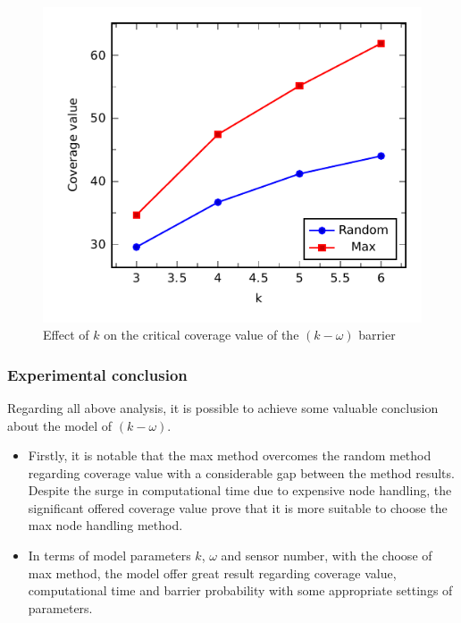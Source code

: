 \begin{figure}[h]
	\centering
	\includegraphics[scale=1.]{Hinhanh/kEffect/main.pdf}
	\caption{Effect of $k$ on the critical coverage value of the $(k-\omega)$ barrier}
	\label{fig:}
\end{figure}

\subsubsection{Experimental conclusion}
Regarding all above analysis, it is possible to achieve some valuable conclusion about the model of $(k-\omega)$.
\begin{itemize}
	\item Firstly, it is notable that the max method overcomes the random method regarding coverage value with a considerable gap between the method results. Despite the surge in computational time due to expensive node handling, the significant offered coverage value prove that it is more suitable to choose the max node handling method.
	\item In terms of model parameters $k$, $\omega$ and sensor number, with the choose of max method, the model offer great result regarding coverage value, computational time and barrier probability with some appropriate settings of parameters.
\end{itemize}